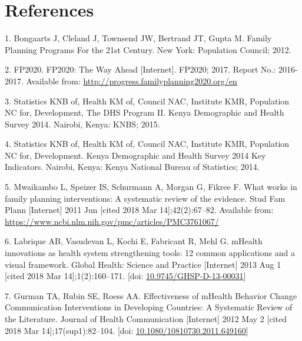 \documentclass[man]{apa6}
\theoremstyle{definition}
\theoremstyle{definition}
\theoremstyle{definition}
\theoremstyle{remark}
\begin{document}
\hypertarget{references}{%
\section{References}\label{references}}

\setlength{\parindent}{-0.5in}\setlength{\leftskip}{0.5in}

\hypertarget{refs}{}
\leavevmode\hypertarget{ref-bongaarts:2012}{}%
1. Bongaarts J, Cleland J, Townsend JW, Bertrand JT, Gupta M. Family
Planning Programs For the 21st Century. New York: Population Council;
2012.

\leavevmode\hypertarget{ref-fp2020:2017}{}%
2. FP2020. FP2020: The Way Ahead {[}Internet{]}. FP2020; 2017. Report
No.: 2016-2017. Available from:
\url{http://progress.familyplanning2020.org/en}

\leavevmode\hypertarget{ref-kenyanationalbureauofstatistics:2015}{}%
3. Statistics KNB of, Health KM of, Council NAC, Institute KMR,
Population NC for, Development, The DHS Program II. Kenya Demographic
and Health Survey 2014. Nairobi, Kenya: KNBS; 2015.

\leavevmode\hypertarget{ref-kenyanationalbureauofstatistics:2014}{}%
4. Statistics KNB of, Health KM of, Council NAC, Institute KMR,
Population NC for, Development. Kenya Demographic and Health Survey 2014
Key Indicators. Nairobi, Kenya: Kenya National Bureau of Statistics;
2014.

\leavevmode\hypertarget{ref-mwaikambo:2011}{}%
5. Mwaikambo L, Speizer IS, Schurmann A, Morgan G, Fikree F. What works
in family planning interventions: A systematic review of the evidence.
Stud Fam Plann {[}Internet{]} 2011 Jun {[}cited 2018 Mar
14{]};42(2):67--82. Available from:
\url{https://www.ncbi.nlm.nih.gov/pmc/articles/PMC3761067/}

\leavevmode\hypertarget{ref-labrique:2013}{}%
6. Labrique AB, Vasudevan L, Kochi E, Fabricant R, Mehl G. mHealth
innovations as health system strengthening tools: 12 common applications
and a visual framework. Global Health: Science and Practice
{[}Internet{]} 2013 Aug 1 {[}cited 2018 Mar 14{]};1(2):160--171. {[}doi:
\href{https://doi.org/10.9745/GHSP-D-13-00031}{10.9745/GHSP-D-13-00031}{]}

\leavevmode\hypertarget{ref-gurman:2012}{}%
7. Gurman TA, Rubin SE, Roess AA. Effectiveness of mHealth Behavior
Change Communication Interventions in Developing Countries: A Systematic
Review of the Literature. Journal of Health Communication {[}Internet{]}
2012 May 2 {[}cited 2018 Mar 14{]};17(sup1):82--104. {[}doi:
\href{https://doi.org/10.1080/10810730.2011.649160}{10.1080/10810730.2011.649160}{]}
\end{document}

